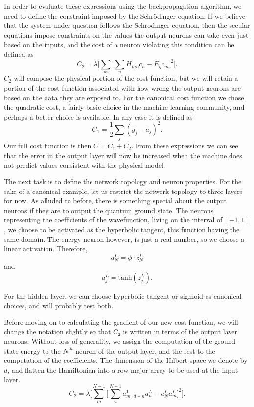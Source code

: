 In order to evaluate these expressions using the backpropagation algorithm, 
we need to define the constraint imposed by the Schr\"{o}dinger equation. 
If we believe that the system under question follows the Schr\"{o}dinger equation, 
then the secular equations impose constraints on the values the output neurons 
can take even just based on the inputs, and the cost of a neuron violating this 
condition can be defined as
\begin{equation}
	C_2 =
	\lambda 
	\Big[ 
		\sum_m \big[\sum_n H_{mn} c_n - E_g c_m \big]^2
	\Big].
\end{equation}
$C_2$ will compose the physical portion of the cost function, but we will retain a 
portion of the cost function associated with how wrong the output neurons are based 
on the data they are exposed to. For the canonical cost function we chose 
the quadratic cost, a fairly basic choice in the machine learning 
community, and perhaps a better choice is available. In any case it is defined as
\begin{equation}
	C_1 = \frac{1}{2} \sum_j (y_j - a_j)^2.
\end{equation}
Our full cost function is then $C = C_1 + C_2$. From these expressions we can
see that the error in the output layer will now be increased when the machine
does not predict values consistent with the physical model. 

The next task is to define the network topology and neuron properties. For the
sake of a canonical example, let us restrict the network topology to three
layers for now.  As alluded to before, there is something special about the
output neurons if they are to output the quantum ground state. The neurons
representing the coefficients of the wavefunction, living on the interval of
$[-1,1]$, we choose to be activated as the hyperbolic tangent, this function
having the same domain. The energy neuron however, is just a real number, so we
choose a linear activation. Therefore, 
\begin{equation}
	a^L_N = \phi \cdot z^L_N
\end{equation}
and 
\begin{equation}
	a^L_j = \mathrm{tanh}(z^L_j).
\end{equation}

For the hidden layer, we can choose hyperbolic
tangent or sigmoid as canonical choices, and will probably test both. 

Before moving on to calculating the gradient of our new cost function, we will
change the notation slightly so that $C_2$ is written in terms of the output
layer neurons. Without loss of generality, we assign the computation of the
ground state energy to the $N^{th}$ neuron of the output layer, and the rest to
the computation of the coefficients. The dimension of the Hilbert space we
denote by $d$, and flatten the Hamiltonian into a row-major array to be used
at the input layer. 
\begin{equation}
	C_2 =
	\lambda 
	\Big[ 
		\sum^{N-1}_m \big[\sum^{N-1}_n a^1_{m \cdot d + n} a^L_n - a^L_N a^L_m \big]^2
	\Big].
\end{equation}

